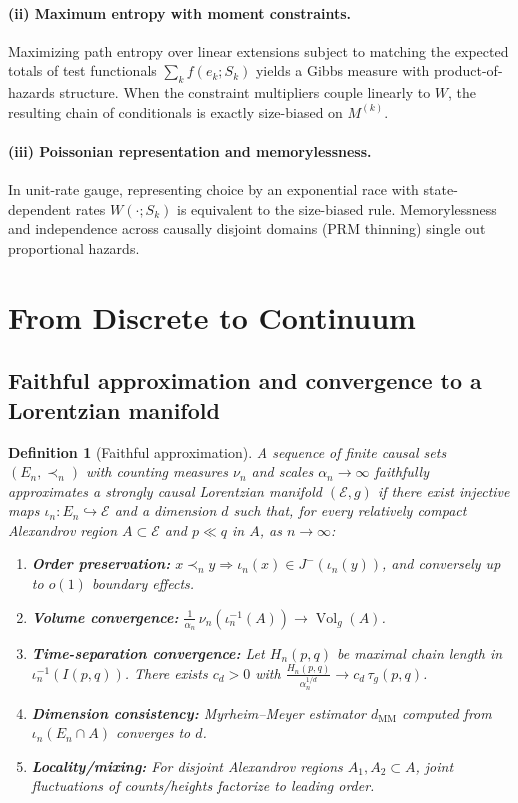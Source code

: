 \documentclass[12pt,a4paper]{article}
\newtheorem{definition}{Definition}
\DeclareMathOperator{\Vol}{Vol}
\begin{document}
\paragraph{(ii) Maximum entropy with moment constraints.}
Maximizing path entropy over linear extensions subject to matching the expected totals of test functionals $\sum_{k} f(e_k;S_k)$ yields a Gibbs measure with product-of-hazards structure. When the constraint multipliers couple linearly to $W$, the resulting chain of conditionals is exactly size-biased on $M^{(k)}$.

\paragraph{(iii) Poissonian representation and memorylessness.}
In unit-rate gauge, representing choice by an exponential race with state-dependent rates $W(\cdot;S_k)$ is equivalent to the size-biased rule. Memorylessness and independence across causally disjoint domains (PRM thinning) single out proportional hazards.


\section{From Discrete to Continuum}

\subsection{Faithful approximation and convergence to a Lorentzian manifold}
\begin{definition}[Faithful approximation]\label{def:faithful}
A sequence of finite causal sets $(E_n,\prec_n)$ with counting measures $\nu_n$ and scales $\alpha_n\to\infty$
\emph{faithfully approximates} a strongly causal Lorentzian manifold $(\mathcal E,g)$ if there exist injective maps
$\iota_n:E_n\hookrightarrow \mathcal E$ and a dimension $d$ such that, for every relatively compact Alexandrov region
$A\subset\mathcal E$ and $p\ll q$ in $A$, as $n\to\infty$:
\begin{enumerate}
\item[(CL1)] \textbf{Order preservation:} $x\prec_n y \Rightarrow \iota_n(x)\in J^-(\iota_n(y))$, and conversely up to $o(1)$ boundary effects.
\item[(CL2)] \textbf{Volume convergence:} $\frac{1}{\alpha_n}\,\nu_n(\iota_n^{-1}(A)) \to \Vol_g(A)$.
\item[(CL3)] \textbf{Time-separation convergence:} Let $H_n(p,q)$ be maximal chain length in $\iota_n^{-1}(I(p,q))$.
There exists $c_d>0$ with $\frac{H_n(p,q)}{\alpha_n^{1/d}}\to c_d\,\tau_g(p,q)$.
\item[(CL4)] \textbf{Dimension consistency:} Myrheim--Meyer estimator $d_{\mathrm{MM}}$ computed from $\iota_n(E_n\cap A)$ converges to $d$.
\item[(CL5)] \textbf{Locality/mixing:} For disjoint Alexandrov regions $A_1,A_2\subset A$, joint fluctuations of counts/heights factorize to leading order.
\end{enumerate}
\end{definition}
\end{document}
